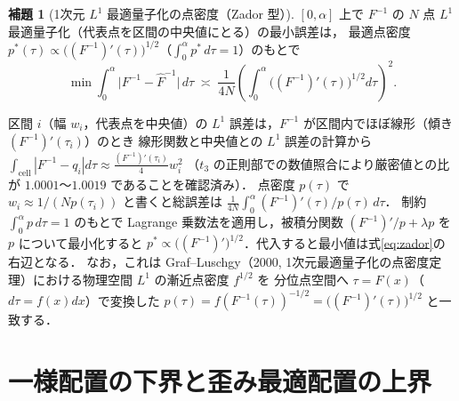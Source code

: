 \documentclass[a4paper,10pt]{jsarticle}
\makeatletter
\theoremstyle{definition}
\newtheorem{lemma}{補題}[section]
\renewenvironment{proof}[1][\proofname]{\par
  \pushQED{\qed}%
  \normalfont \topsep6\p@\@plus6\p@\relax
  \trivlist
  \item[\hskip\labelsep\textbf{#1}]\ignorespaces
}{%
  \popQED\endtrivlist\@endpefalse
}
\renewcommand{\proofname}{証明}
\newcommand{\Finv}{F^{-1}}
\newcommand{\Fhinv}{\hat{F}^{-1}}
\makeatother
\begin{document}
\begin{lemma}[1次元 $L^1$ 最適量子化の点密度（Zador 型）]
\label{lem:zador}
$[0,\alpha]$ 上で $\Finv$ の $N$ 点 $L^1$ 最適量子化（代表点を区間の中央値にとる）の最小誤差は，
最適点密度 $p^*(\tau)\propto\bigl((\Finv)'(\tau)\bigr)^{1/2}$（$\int_0^\alpha p^*\,d\tau=1$）のもとで
\begin{equation}
  \min\int_0^\alpha\bigl|\Finv-\Fhinv\bigr|\,d\tau
  \;\asymp\;\frac1{4N}\left(\int_0^\alpha\bigl((\Finv)'(\tau)\bigr)^{1/2}d\tau\right)^{2}.
  \label{eq:zador}
\end{equation}
\end{lemma}
\begin{proof}
区間 $i$（幅 $w_i$，代表点を中央値）の $L^1$ 誤差は，$\Finv$ が区間内でほぼ線形（傾き $(\Finv)'(\tau_i)$）のとき
線形関数と中央値との $L^1$ 誤差の計算から $\int_{\mathrm{cell}}|\Finv-q_i|d\tau\approx\frac{(\Finv)'(\tau_i)}{4}w_i^2$
（$t_3$ の正則部での数値照合により厳密値との比が $1.0001$〜$1.0019$ であることを確認済み）．
点密度 $p(\tau)$ で $w_i\approx1/(Np(\tau_i))$ と書くと総誤差は $\frac1{4N}\int_0^\alpha(\Finv)'(\tau)/p(\tau)\,d\tau$．
制約 $\int_0^\alpha p\,d\tau=1$ のもとで Lagrange 乗数法を適用し，被積分関数 $(\Finv)'/p+\lambda p$ を $p$ について最小化すると
$p^*\propto\bigl((\Finv)'\bigr)^{1/2}$．代入すると最小値は式\eqref{eq:zador}の右辺となる．
なお，これは Graf--Luschgy（2000, 1次元最適量子化の点密度定理）における物理空間 $L^1$ の漸近点密度 $f^{1/2}$ を
分位点空間へ $\tau=F(x)$（$d\tau=f(x)dx$）で変換した
$p(\tau)=f(F^{-1}(\tau))^{-1/2}=\bigl((\Finv)'(\tau)\bigr)^{1/2}$ と一致する．
\end{proof}

\section{一様配置の下界と歪み最適配置の上界}
\end{document}

